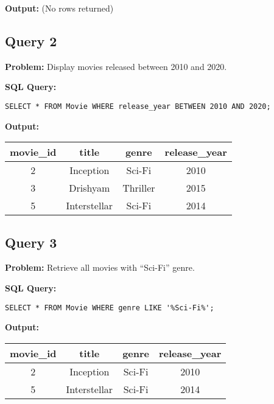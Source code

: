 \documentclass[12pt]{article}
\begin{document}
\textbf{Output:}  
(No rows returned)

\vspace{0.5cm}

\subsection*{Query 2}
\textbf{Problem:} Display movies released between 2010 and 2020.  

\textbf{SQL Query:}  
\begin{verbatim}
SELECT * FROM Movie WHERE release_year BETWEEN 2010 AND 2020;
\end{verbatim}

\textbf{Output:}

\begin{tabular}{|c|c|c|c|}
\hline
movie\_id & title & genre & release\_year \\
\hline
2 & Inception & Sci-Fi & 2010 \\
3 & Drishyam & Thriller & 2015 \\
5 & Interstellar & Sci-Fi & 2014 \\
\hline
\end{tabular}

\vspace{0.5cm}

\subsection*{Query 3}
\textbf{Problem:} Retrieve all movies with ``Sci-Fi'' genre.  

\textbf{SQL Query:}  
\begin{verbatim}
SELECT * FROM Movie WHERE genre LIKE '%Sci-Fi%';
\end{verbatim}

\textbf{Output:}

\begin{tabular}{|c|c|c|c|}
\hline
movie\_id & title & genre & release\_year \\
\hline
2 & Inception & Sci-Fi & 2010 \\
5 & Interstellar & Sci-Fi & 2014 \\
\hline
\end{tabular}
\end{document}
